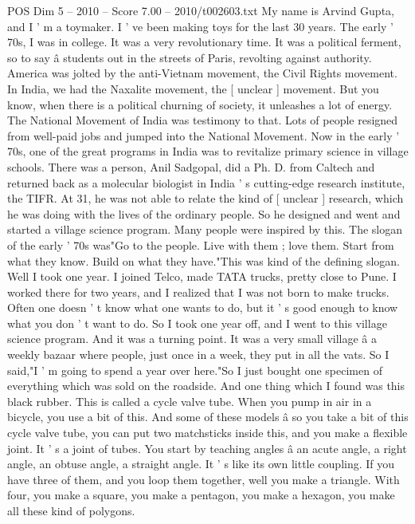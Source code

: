 \begin{textsample}{POS Dim 5 – 2010 – Score 7.00 – 2010/t002603.txt}  \label{ex:f5_pos_029}
My name is Arvind Gupta, and I ' m a toymaker.
I ' ve been making toys for the last 30 years.
The early ' 70s, I was in college.
It was a very revolutionary time.
It was a political ferment, so to say â students out in the streets of Paris, revolting against authority.
America was jolted by the anti-Vietnam movement, the Civil Rights movement.
In India, we had the Naxalite movement, the [ unclear ] movement.
But you know, when there is a political churning of society, it unleashes a lot of energy.
The National Movement of India was testimony to that.
Lots of people resigned from well-paid jobs and jumped into the National Movement.
Now in the early ' 70s, one of the great programs in India was to revitalize primary science in village schools.
There was a person, Anil Sadgopal, did a Ph.
D. from Caltech and returned back as a molecular biologist in India ' s cutting-edge research institute, the TIFR.
At 31, he was not able to relate the kind of [ unclear ] research, which he was doing with the lives of the ordinary people.
So he designed and went and started a village science program.
Many people were inspired by this.
The slogan of the early ' 70s was"Go to the people.
Live with them ; love them.
Start from what they know.
Build on what they have."This was kind of the defining slogan.
Well I took one year.
I joined Telco, made TATA trucks, pretty close to Pune.
I worked there for two years, and I realized that I was not born to make trucks.
Often one doesn ' t know what one wants to do, but it ' s good enough to know what you don ' t want to do.
So I took one year off, and I went to this village science program.
And it was a turning point.
It was a very small village â a weekly bazaar where people, just once in a week, they put in all the vats.
So I said,"I ' m going to spend a year over here."So I just bought one specimen of everything which was sold on the roadside.
And one thing which I found was this black rubber.
This is called a cycle valve tube.
When you pump in air in a bicycle, you use a bit of this.
And some of these models â so you take a bit of this cycle valve tube, you can put two matchsticks inside this, and you make a flexible joint.
It ' s a joint of tubes.
You start by teaching angles â an acute angle, a right angle, an obtuse angle, a straight angle.
It ' s like its own little coupling.
If you have three of them, and you loop them together, well you make a triangle.
With four, you make a square, you make a pentagon, you make a hexagon, you make all these kind of polygons.

\end{textsample}

